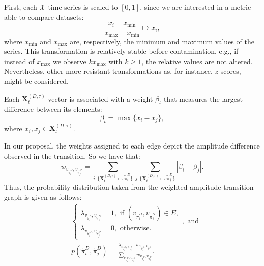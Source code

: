 \documentclass[journal]{IEEEtran}
\begin{document}
First, each $\mathcal{X}$ time series is scaled to $[0, 1]$, since we are interested in a metric able to compare datasets:
\begin{equation}
	\frac{x_i - x_{\min}}{x_{\max} - x_{\min}} \longmapsto x_i,
\end{equation}
where $x_{\min}$ and $x_{\max}$ are, respectively, the minimum and maximum values of the series.
This transformation is relatively stable before contamination, e.g., if instead of $x_{\max}$ we observe $k x_{\max}$ with $k\geq 1$, the relative values are not altered. Nevertheless, other more resistant transformations as, for instance, $z$ scores, might be considered.


Each $\mathbf{X}^{(D, \tau)}_t$ vector is associated with a weight $\beta_t$ that measures the largest difference between its elements:
\begin{equation}
	\beta_t = \max\{x_i - x_j\},
\end{equation}
where $x_i, x_j \in \mathbf{X}^{(D, \tau)}_t$.

In our proposal, the weights assigned to each edge depict the amplitude difference observed in the transition.
So we have that:	
\begin{equation}
	w_{v_{\widetilde \pi^D_i}, v_{\widetilde \pi^D_j}} =  \sum_{i : \{\mathbf{X}^{(D,\tau)}_t \mapsto \widetilde\pi^D_i\}} \sum_{j : \{\mathbf{X}^{(D,\tau)}_t \mapsto \widetilde\pi^D_j\}} |\beta_i - \beta_j| .
\end{equation}
Thus, the probability distribution taken from the weighted amplitude transition graph is given as follows:	
\begin{align}
	&\left\{\begin{array}{l}
		\lambda_{v_{\widetilde\pi^D_i}, v_{\widetilde\pi^D_j}} = 1, \text{ if } (v_{\widetilde\pi^D_i}, v_{\widetilde\pi^D_j}) \in {E}, \\
		\lambda_{v_{\widetilde\pi^D_i}, v_{\widetilde\pi^D_j}} = 0, \text{ otherwise}.
	\end{array}\right., \text{ and} \\
	&p(\widetilde\pi^D_i, \widetilde\pi^D_j) = \frac{\lambda_{v_{\widetilde\pi^D_i}, v_{\widetilde\pi^D_j}} \cdot w_{v_{\widetilde\pi^D_i}, v_{\widetilde\pi^D_j}}}{\sum_{v_{\widetilde\pi^D_a}, v_{\widetilde\pi^D_b}} w_{v_{\widetilde\pi^D_a}, v_{\widetilde\pi^D_b}}}.
\end{align}
\end{document}
